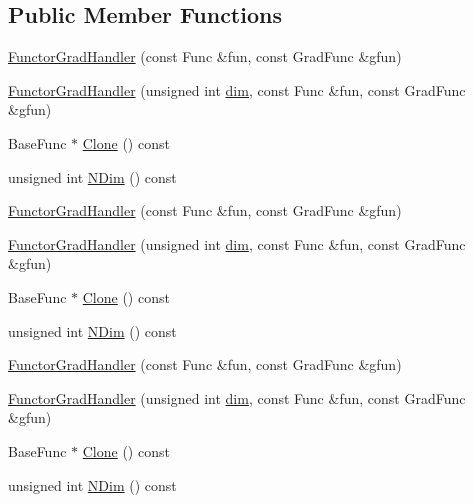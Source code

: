 \subsection*{Public Member Functions}
\begin{DoxyCompactItemize}
\item 
\mbox{\hyperlink{classROOT_1_1Math_1_1FunctorGradHandler_a139441c0174a37b1385732b0f7602ad7}{Functor\+Grad\+Handler}} (const Func \&fun, const Grad\+Func \&gfun)
\item 
\mbox{\hyperlink{classROOT_1_1Math_1_1FunctorGradHandler_a5d5fdce3fadf4956e92c0057471e75a6}{Functor\+Grad\+Handler}} (unsigned int \mbox{\hyperlink{adat__devel_2lib_2hadron_2irrep__util_8cc_a70b5e28b5bc3d1b63a7435c5fe50b837}{dim}}, const Func \&fun, const Grad\+Func \&gfun)
\item 
Base\+Func $\ast$ \mbox{\hyperlink{classROOT_1_1Math_1_1FunctorGradHandler_a20e9b0e519dc524cdf964912cf63083e}{Clone}} () const
\item 
unsigned int \mbox{\hyperlink{classROOT_1_1Math_1_1FunctorGradHandler_a9fd1149654daac8b76a15f877663ff82}{N\+Dim}} () const
\item 
\mbox{\hyperlink{classROOT_1_1Math_1_1FunctorGradHandler_a139441c0174a37b1385732b0f7602ad7}{Functor\+Grad\+Handler}} (const Func \&fun, const Grad\+Func \&gfun)
\item 
\mbox{\hyperlink{classROOT_1_1Math_1_1FunctorGradHandler_a5d5fdce3fadf4956e92c0057471e75a6}{Functor\+Grad\+Handler}} (unsigned int \mbox{\hyperlink{adat__devel_2lib_2hadron_2irrep__util_8cc_a70b5e28b5bc3d1b63a7435c5fe50b837}{dim}}, const Func \&fun, const Grad\+Func \&gfun)
\item 
Base\+Func $\ast$ \mbox{\hyperlink{classROOT_1_1Math_1_1FunctorGradHandler_a20e9b0e519dc524cdf964912cf63083e}{Clone}} () const
\item 
unsigned int \mbox{\hyperlink{classROOT_1_1Math_1_1FunctorGradHandler_a9fd1149654daac8b76a15f877663ff82}{N\+Dim}} () const
\item 
\mbox{\hyperlink{classROOT_1_1Math_1_1FunctorGradHandler_a139441c0174a37b1385732b0f7602ad7}{Functor\+Grad\+Handler}} (const Func \&fun, const Grad\+Func \&gfun)
\item 
\mbox{\hyperlink{classROOT_1_1Math_1_1FunctorGradHandler_a5d5fdce3fadf4956e92c0057471e75a6}{Functor\+Grad\+Handler}} (unsigned int \mbox{\hyperlink{adat__devel_2lib_2hadron_2irrep__util_8cc_a70b5e28b5bc3d1b63a7435c5fe50b837}{dim}}, const Func \&fun, const Grad\+Func \&gfun)
\item 
Base\+Func $\ast$ \mbox{\hyperlink{classROOT_1_1Math_1_1FunctorGradHandler_a20e9b0e519dc524cdf964912cf63083e}{Clone}} () const
\item 
unsigned int \mbox{\hyperlink{classROOT_1_1Math_1_1FunctorGradHandler_a9fd1149654daac8b76a15f877663ff82}{N\+Dim}} () const
\end{DoxyCompactItemize}


